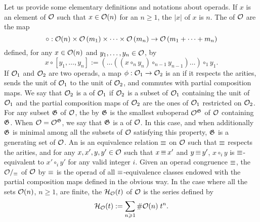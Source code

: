 Let us provide some elementary definitions and notations about operads.
If $x$ is an element of $\mathcal{O}$ such that $x \in \mathcal{O}(n)$ for an
$n \geq 1$, the  $|x|$ of $x$ is $n$. The
 of $\mathcal{O}$ are the map
\begin{equation}
    \circ : \mathcal{O}(n) \times
    \mathcal{O}\left(m_1\right) \times \dots \times \mathcal{O}\left(m_n\right)
    \to \mathcal{O}\left(m_1 + \dots + m_n\right)
\end{equation}
defined, for any $x \in \mathcal{O}(n)$ and $y_1, \dots, y_n \in \mathcal{O}$, by
\begin{equation} \label{equ:complete_composition}
    x \circ \left[y_1, \dots, y_n\right] :=
    \left(\dots \left(\left(x \circ_n y_n\right)
    \circ_{n - 1} y_{n - 1}\right) \dots\right) \circ_1 y_1.
\end{equation}
If $\mathcal{O}_1$ and $\mathcal{O}_2$ are two operads, a map
$\phi : \mathcal{O}_1 \to \mathcal{O}_2$ is an  if it respects
the arities, sends the unit of $\mathcal{O}_1$ to the unit of $\mathcal{O}_2$, and
commutes with partial composition maps. We say that $\mathcal{O}_2$ is a
 of $\mathcal{O}_1$ if $\mathcal{O}_2$ is a subset of $\mathcal{O}_1$
containing the unit of $\mathcal{O}_1$ and the partial composition maps of
$\mathcal{O}_2$ are the ones of $\mathcal{O}_1$ restricted on $\mathcal{O}_2$. For any subset
$\mathfrak{G}$ of $\mathcal{O}$, the  by
$\mathfrak{G}$ is the smallest suboperad $\mathcal{O}^{\mathfrak{G}}$ of
$\mathcal{O}$ containing $\mathfrak{G}$. When $\mathcal{O} = \mathcal{O}^{\mathfrak{G}}$,
we say that $\mathfrak{G}$ is a  of $\mathcal{O}$. In
this case, and when additionally $\mathfrak{G}$ is minimal among all
the subsets of $\mathcal{O}$ satisfying this property, $\mathfrak{G}$ is a
 generating set of $\mathcal{O}$. An  is an
equivalence relation $\operatorname{\equiv}$ on $\mathcal{O}$ such that $\operatorname{\equiv}$ respects the
arities, and for any $x, x', y, y' \in \mathcal{O}$ such that $x \operatorname{\equiv} x'$ and
$y \operatorname{\equiv} y'$, $x \circ_i y$ is $\operatorname{\equiv}$-equivalent to $x' \circ_i y'$
for any valid integer $i$. Given an operad congruence $\operatorname{\equiv}$, the
 $\mathcal{O}/_{\operatorname{\equiv}}$ of $\mathcal{O}$ by $\operatorname{\equiv}$ is the
operad of all $\operatorname{\equiv}$-equivalence classes endowed with the partial
composition maps defined in the obvious way. In the case where all the
sets $\mathcal{O}(n)$, $n \geq 1$, are finite, the 
$\mathcal{H}_{\mathcal{O}}(t)$ of $\mathcal{O}$ is the series defined by
\begin{equation} \label{equ:hilbert_series}
    \mathcal{H}_{\mathcal{O}}(t) := \sum_{n \geqslant 1} \# \mathcal{O}(n) \; t^n.
\end{equation}
\medbreak

